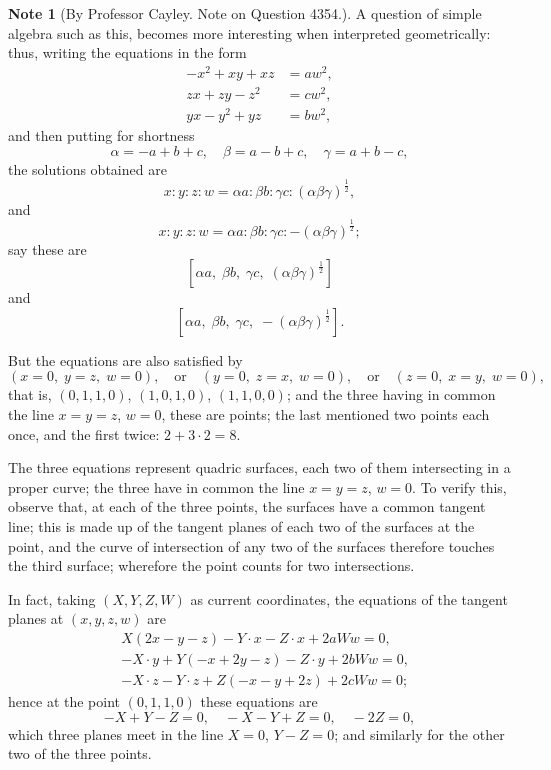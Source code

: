 \documentclass[11pt,a4paper]{article}
\theoremstyle{definition}
\newtheorem*{note}{Note}
\begin{document}
\begin{note}[By Professor Cayley. Note on Question 4354.]
A question of simple algebra such as this, becomes more interesting when interpreted geometrically: thus, writing the equations in the form
\[
\begin{aligned}
-x^2 + xy + xz &= aw^2, \\
zx + zy - z^2 &= cw^2, \\
yx - y^2 + yz &= bw^2,
\end{aligned}
\]
and then putting for shortness
\[
\alpha = -a + b + c, \quad
\beta = a - b + c, \quad
\gamma = a + b - c,
\]
the solutions obtained are
\[
x : y : z : w = \alpha a : \beta b : \gamma c : (\alpha\beta\gamma)^{\frac{1}{2}},
\]
and
\[
x : y : z : w = \alpha a : \beta b : \gamma c : -(\alpha\beta\gamma)^{\frac{1}{2}};
\]
say these are
\[
[\alpha a, \; \beta b, \; \gamma c, \; (\alpha\beta\gamma)^{\frac{1}{2}}]
\]
and
\[
[\alpha a, \; \beta b, \; \gamma c, \; -(\alpha\beta\gamma)^{\frac{1}{2}}].
\]

But the equations are also satisfied by
\[
(x=0, \; y=z, \; w=0), \quad\text{or}\quad (y=0, \; z=x, \; w=0), \quad\text{or}\quad (z=0, \; x=y, \; w=0),
\]
that is, $(0,1,1,0)$, $(1,0,1,0)$, $(1,1,0,0)$; and the three having in common the line $x=y=z$, $w=0$, these are points; the last mentioned two points each once, and the first twice: $2 + 3 \cdot 2 = 8$.

The three equations represent quadric surfaces, each two of them intersecting in a proper curve; the three have in common the line $x=y=z$, $w=0$. To verify this, observe that, at each of the three points, the surfaces have a common tangent line; this is made up of the tangent planes of each two of the surfaces at the point, and the curve of intersection of any two of the surfaces therefore touches the third surface; wherefore the point counts for two intersections.

In fact, taking $(X,Y,Z,W)$ as current coordinates, the equations of the tangent planes at $(x,y,z,w)$ are
\[
\begin{aligned}
&X(2x-y-z) - Y\cdot x - Z\cdot x + 2aWw = 0, \\
&-X\cdot y + Y(-x+2y-z) - Z\cdot y + 2bWw = 0, \\
&-X\cdot z - Y\cdot z + Z(-x-y+2z) + 2cWw = 0;
\end{aligned}
\]
hence at the point $(0,1,1,0)$ these equations are
\[
-X + Y - Z = 0, \quad -X - Y + Z = 0, \quad -2Z = 0,
\]
which three planes meet in the line $X=0$, $Y-Z=0$; and similarly for the other two of the three points.
\end{note}
\end{document}
